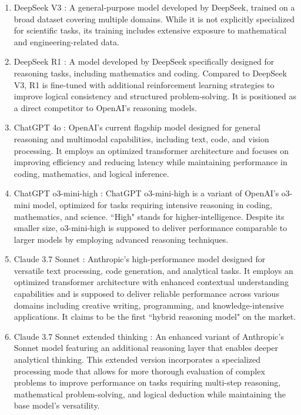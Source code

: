 \documentclass{article}
\begin{document}
\begin{enumerate}
    \item DeepSeek V3 \cite{deepseekai2024deepseekv3technicalreport}: A general-purpose model developed by DeepSeek, trained on a broad dataset covering multiple domains. While it is not explicitly specialized for scientific tasks, its training includes extensive exposure to mathematical and engineering-related data. 
    \item DeepSeek R1 \cite{deepseekai2025deepseekr1incentivizingreasoningcapability}: A model developed by DeepSeek specifically designed for reasoning tasks, including mathematics and coding. Compared to DeepSeek V3, R1 is fine-tuned with additional reinforcement learning strategies to improve logical consistency and structured problem-solving. It is positioned as a direct competitor to OpenAI’s reasoning models.  
    \item ChatGPT 4o \cite{openai_gpt_4o_2024}: OpenAI’s current flagship model designed for general reasoning and multimodal capabilities, including text, code, and vision processing. It employs an optimized transformer architecture and focuses on improving efficiency and reducing latency while maintaining performance in coding, mathematics, and logical inference.
    \item ChatGPT o3-mini-high \cite{openai_o3_mini_2025}: ChatGPT o3-mini-high is a variant of OpenAI's o3-mini model, optimized for tasks requiring intensive reasoning in coding, mathematics, and science. ``High" stands for higher-intelligence. Despite its smaller size, o3-mini-high is supposed to deliver performance comparable to larger models by employing advanced reasoning techniques.
    \item Claude 3.7 Sonnet \cite{anthropicclaude3.7sonnet}: Anthropic's high-performance model designed for versatile text processing, code generation, and analytical tasks. It employs an optimized transformer architecture with enhanced contextual understanding capabilities and is supposed to deliver reliable performance across various domains including creative writing, programming, and knowledge-intensive applications. It claims to be the first ``hybrid reasoning model" on the market. 
    \item Claude 3.7 Sonnet extended thinking \cite{anthropicclaude3.7sonnet}: An enhanced variant of Anthropic's Sonnet model featuring an additional reasoning layer that enables deeper analytical thinking. This extended version incorporates a specialized processing mode that allows for more thorough evaluation of complex problems to improve performance on tasks requiring multi-step reasoning, mathematical problem-solving, and logical deduction while maintaining the base model's versatility.

    
\end{enumerate}
\end{document}
